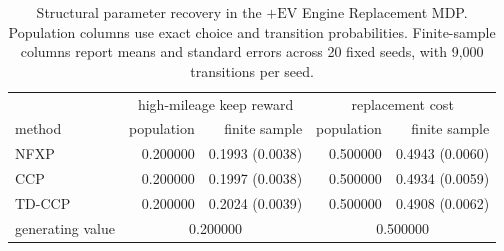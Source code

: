 \begin{table}[h]
\centering
\caption{Structural parameter recovery in the $+\mathrm{EV}$ Engine Replacement MDP. Population columns use exact choice and transition probabilities. Finite-sample columns report means and standard errors across 20 fixed seeds, with 9,000 transitions per seed.}
\label{tab:engine_estimation}
\small
\begin{tabular}{lrrrr}
\hline
 & \multicolumn{2}{c}{high-mileage keep reward} & \multicolumn{2}{c}{replacement cost} \\
method & population & finite sample & population & finite sample \\
\hline
NFXP & 0.200000 & 0.1993 (0.0038) & 0.500000 & 0.4943 (0.0060) \\
CCP & 0.200000 & 0.1997 (0.0038) & 0.500000 & 0.4934 (0.0059) \\
TD-CCP & 0.200000 & 0.2024 (0.0039) & 0.500000 & 0.4908 (0.0062) \\
\hline
generating value & \multicolumn{2}{c}{0.200000} & \multicolumn{2}{c}{0.500000} \\
\hline
\end{tabular}
\end{table}
